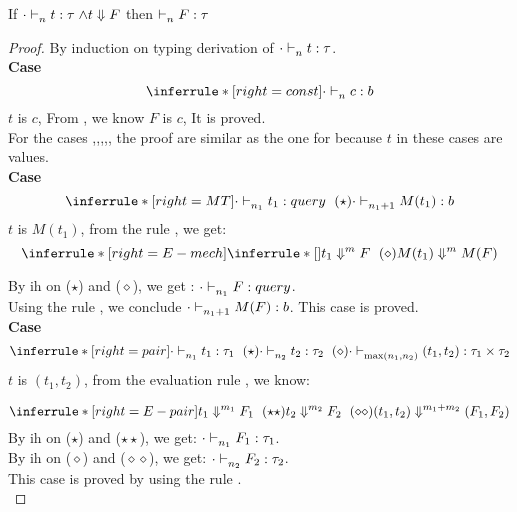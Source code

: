 \documentclass{article}
\begin{document}
\begin{theorem}[Preservation]
	If $\cdot\mathrel{\vdash_{n}^{} {t} : {\tau}} \land t \Downarrow F$ then $ \mathrel{\vdash_{n}^{} {F} : {\tau}} $
\end{theorem}
\begin{proof}
  By induction on typing derivation of $\cdot \mathrel{\vdash_{n}^{} {t} : {\tau}} $.\\
  
  \noindent \textbf{Case}
  \[
   \inferrule*[right = const]
   {\empty}
   {\cdot \jtype{n}{}{c}{b}  }
  \]
  $t$ is $c$, From , we know $F$ is $c$, It is proved.\\
 
 For the cases ,,,,, the proof are similar as the one for  because $t$ in these cases are values.\\
 
 \noindent \textbf{Case}
 \[
  \inferrule*[ right = MT ]
   {\cdot \jtype{n_1}{}{t_1}{query}~(\star)}
   {\cdot \jtype{n_1+1}{}{M(t_1)}{b}  }
 \]
  $t$ is $M(t_1)$, from the rule , we get: 
  \[
      \inferrule*[ right=E-mech]
  { 
    \inferrule*[]
    {}
    {\eval{  t_1  }{ F }{m }~(\diamond)  }
  }
  { \eval{  M(t_1)  }{ M(F)  }{  m } }
  \]
  
  By ih on ($\star$) and ($\diamond$), we get : 
  $ \cdot \mathrel{\vdash_{n_1}^{} {F} : {query}} $. \\
  Using the rule , we conclude $\cdot \mathrel{\vdash_{n_1+1}^{} {M(F)} : {b}} $. This case is proved.\\
  
  \noindent \textbf{Case}
  \[
  \inferrule*[right = pair]
   {\cdot \jtype{n_1}{}{t_1}{\tau_1}~(\star) \\ \cdot \jtype{n_2}{}{t_2}{\tau_2}~(\diamond) }
   { \cdot \jtype{\max(n_1,n_2)}{}{(t_1, t_2)}{\tau_1 \times \tau_2}  }
  \]
  $t$ is $(t_1,t_2)$, from the evaluation rule , we know:
  
  \[
   \inferrule*[ right=E-pair]
  {   
    { \eval{ t_1  }{ F_1  }{m_1}~(\star\star) }
    \\
    { \eval{ t_2  }{ F_2  }{m_2}~(\diamond\diamond) } 
  }
  { \eval{  (t_1,t_2)  }{ (F_1,F_2)  }{ m_1+m_2  } } 
  \]
  By ih on ($\star$) and ($\star\star$), we get: $ \cdot \mathrel{\vdash_{n_1}^{} {F_1} : {\tau_1}} $.\\
  By ih on ($\diamond$) and ($\diamond\diamond$), we get: $ \cdot \mathrel{\vdash_{n_2}^{} {F_2} : {\tau_2}} $.\\
  This case is proved by using the rule .\\
  

\end{proof}
\end{document}
